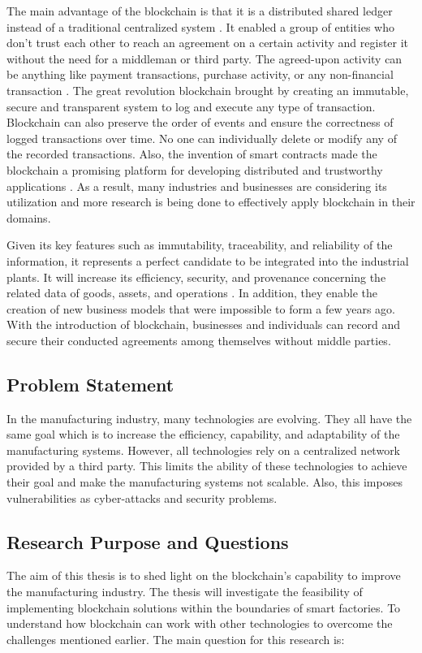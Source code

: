 \documentclass[runningheads]{llncs}
\begin{document}
\noindent The main advantage of the blockchain is that it is a distributed shared ledger instead of a traditional centralized system \cite{Zheng2017}. It enabled a group of entities who don’t trust each other to reach an agreement on a certain activity and register it without the need for a middleman or third party. The agreed-upon activity can be anything like payment transactions, purchase activity, or any non-financial transaction \cite{Mohamed}. The great revolution blockchain brought by creating an immutable, secure and transparent system to log and execute any type of transaction. Blockchain can also preserve the order of events and ensure the correctness of logged transactions over time. No one can individually delete or modify any of the recorded transactions. Also, the invention of smart contracts made the blockchain a promising platform for developing distributed and trustworthy applications \cite{Mohamed}. As a result, many industries and businesses are considering its utilization and more research is being done to effectively apply blockchain in their domains.

\bigbreak

\noindent Given its key features such as immutability, traceability, and reliability of the information, it represents a perfect candidate to be integrated into the industrial plants. It will increase its efficiency, security, and provenance concerning the related data of goods, assets, and operations \cite{Internet2019}. In addition, they enable the creation of new business models that were impossible to form a few years ago. With the introduction of blockchain, businesses and individuals can record and secure their conducted agreements among themselves without middle parties.


\subsection{Problem Statement}
In the manufacturing industry, many technologies are evolving. They all have the same goal which is to increase the efficiency, capability, and adaptability of the manufacturing systems. However, all technologies rely on a centralized network provided by a third party. This limits the ability of these technologies to achieve their goal and make the manufacturing systems not scalable. Also, this imposes vulnerabilities as cyber-attacks and security problems.


\subsection{Research Purpose and Questions}
The aim of this thesis is to shed light on the blockchain’s capability to improve the manufacturing industry. The thesis will investigate the feasibility of implementing blockchain solutions within the boundaries of smart factories. To understand how blockchain can work with other technologies to overcome the challenges mentioned earlier. The main question for this research is:
\end{document}

